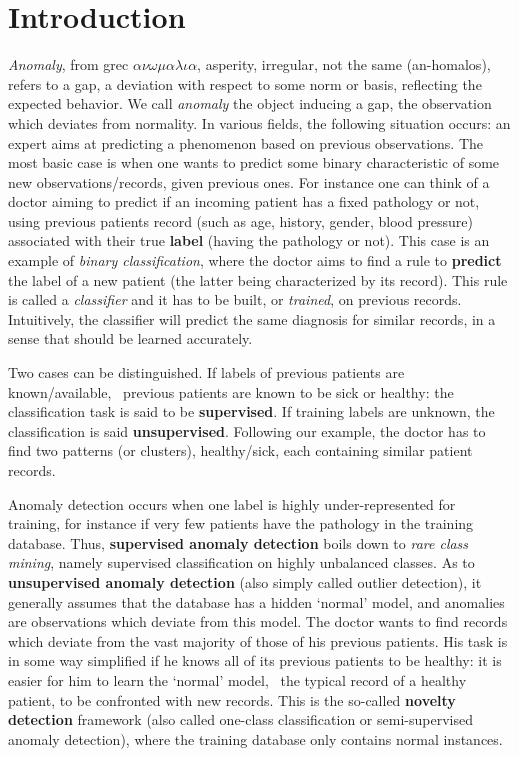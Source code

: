 
\section{Introduction}
\emph{Anomaly}, from grec $\alpha\nu\omega\mu\alpha\lambda\iota\alpha$, asperity, irregular, not the same (an-homalos), refers to a gap, a deviation with respect to some norm or basis, reflecting the expected behavior.
We call \emph{anomaly} the object inducing a gap, the observation which deviates from normality. 
%
In various fields, the following situation occurs: an expert aims at predicting a phenomenon based on previous observations. The most basic case is when one wants to predict some binary characteristic of some new observations/records, given previous ones. For instance one can think of a doctor aiming to predict if an incoming patient has a fixed pathology or not, using previous patients record (such as age, history, gender, blood pressure) associated with their true \textbf{label} (having the pathology or not). This case is an example of \emph{binary classification}, where the doctor aims to find a rule to \textbf{predict} the label of a new patient (the latter being characterized by its record). This rule is called a \emph{classifier} and it has to be built, or \emph{trained}, on previous records. %
Intuitively, the classifier will predict the same diagnosis for similar records, in a sense that should be learned accurately.

Two cases can be distinguished. If labels of previous patients are known/available, \ie~previous patients are known to be sick or healthy: the classification task is said to be \textbf{supervised}. If training labels are unknown, the classification is said \textbf{unsupervised}. Following our example, the doctor has to find two patterns (or clusters), healthy/sick, each containing similar patient records.

Anomaly detection occurs when one label is highly under-represented for training, for instance if very few patients have the pathology in the training database.
Thus, \textbf{supervised anomaly detection} boils down to \emph{rare class mining}, namely supervised classification on highly unbalanced classes. 
As to \textbf{unsupervised anomaly detection} (also simply called outlier detection), it generally assumes that the database has a hidden `normal' model, and anomalies are observations which deviate from this model. The doctor wants to find records which deviate from the vast majority of those of his previous patients. 
%
His task is in some way simplified if he knows all of its previous patients to be healthy: it is easier for him to learn the `normal' model, \ie~the typical record of a healthy patient, to be confronted with new records. This is the so-called \textbf{novelty detection} framework (also called one-class classification or semi-supervised anomaly detection), where the training database only contains normal instances. 

